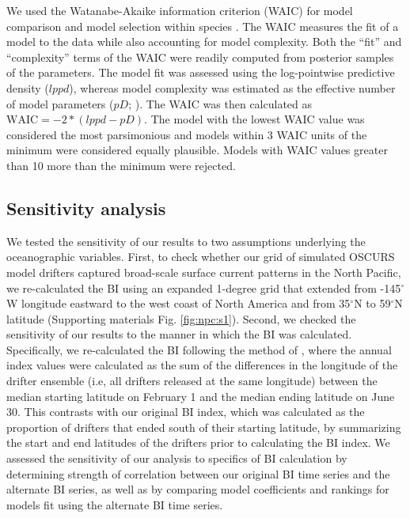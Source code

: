 We used the Watanabe-Akaike information criterion (WAIC) for model comparison
and model selection within species \citep{Watanabe2010, Gelman2013a}. The WAIC
measures the fit of a model to the data while also accounting for model
complexity. Both the ``fit'' and ``complexity'' terms of the WAIC were readily
computed from posterior samples of the parameters. The model fit was assessed
using the log-pointwise predictive density (\(lppd\)), whereas model complexity
was estimated as the effective number of model parameters (\(pD\);
\citealp{Watanabe2010, Gelman2013a}). The WAIC was then calculated as
\(\text{WAIC} = -2 * (lppd - pD)\). The model with the lowest WAIC value was
considered the most parsimonious and models within 3 WAIC units of the minimum
were considered equally plausible. Models with WAIC values greater than 10 more
than the minimum were rejected.


\subsection{Sensitivity analysis}

We tested the sensitivity of our results to two assumptions underlying the
oceanographic variables. First, to check whether our grid of simulated OSCURS
model drifters captured broad-scale surface current patterns in the North
Pacific, we re-calculated the BI using an expanded 1-degree grid that extended
from -145$^{\circ}$W longitude eastward to the west coast of North America and
from 35$^{\circ}$N to 59$^{\circ}$N latitude (Supporting materials Fig.
\ref{fig:npc:s1}). Second, we checked the sensitivity of our results to the
manner in which the BI was calculated. Specifically, we re-calculated the BI
following the method of \citet{Watters2008a}, where the annual index values were
calculated as the sum of the differences in the longitude of the drifter
ensemble (i.e, all drifters released at the same longitude) between the median
starting latitude on February 1 and the median ending latitude on June 30. This
contrasts with our original BI index, which was calculated as the proportion of
drifters that ended south of their starting latitude, by summarizing the start
and end latitudes of the drifters prior to calculating the BI index. We assessed
the sensitivity of our analysis to specifics of BI calculation by determining
strength of correlation between our original BI time series and the alternate BI
series, as well as by comparing model coefficients and rankings for models fit
using the alternate BI time series.

